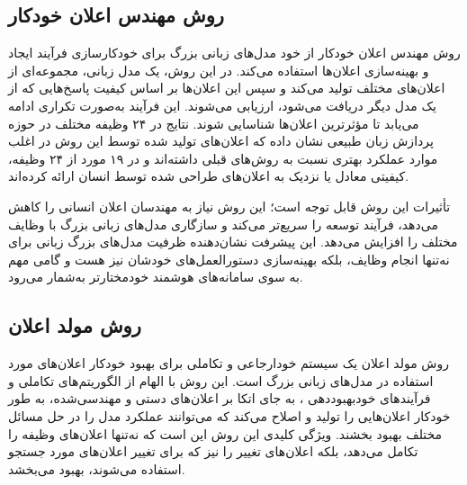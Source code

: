\subsection{روش مهندس اعلان خودکار}
روش  مهندس اعلان خودکار
 \cite{APE}
 از خود مدل‌های زبانی بزرگ برای خودکارسازی فرآیند ایجاد و بهینه‌سازی اعلان‌ها استفاده می‌کند. در این روش، یک مدل زبانی، مجموعه‌ای از اعلان‌های مختلف تولید می‌کند و سپس این اعلان‌ها بر اساس کیفیت پاسخ‌هایی که از یک مدل دیگر دریافت می‌شود، ارزیابی می‌شوند. این فرآیند به‌صورت تکراری ادامه می‌یابد تا مؤثرترین اعلان‌ها شناسایی شوند. نتایج در ۲۴ وظیفه مختلف در حوزه پردازش زبان طبیعی نشان داده که اعلان‌های تولید شده توسط این روش در اغلب موارد عملکرد بهتری نسبت به روش‌های قبلی داشته‌اند و در ۱۹ مورد از ۲۴ وظیفه، کیفیتی معادل یا نزدیک به اعلان‌های طراحی شده توسط انسان ارائه کرده‌اند.

تأثیرات این روش قابل توجه است؛ این روش نیاز به مهندسان اعلان انسانی را کاهش می‌دهد، فرآیند توسعه را سریع‌تر می‌کند و سازگاری مدل‌های زبانی بزرگ با وظایف مختلف را افزایش می‌دهد. این پیشرفت نشان‌دهنده ظرفیت مدل‌های بزرگ زبانی برای نه‌تنها انجام وظایف، بلکه بهینه‌سازی دستورالعمل‌های خودشان نیز هست و گامی مهم به سوی سامانه‌های هوشمند خودمختارتر به‌شمار می‌رود.

\subsection{روش مولد اعلان}
روش مولد اعلان
 \cite{PromptBreeder}
 یک سیستم خودارجاعی
  و تکاملی برای بهبود خودکار اعلان‌های مورد استفاده در مدل‌های زبانی بزرگ است. این روش با الهام از الگوریتم‌های تکاملی و فرآیندهای خودبهبوددهی
  ، به جای اتکا بر اعلان‌های دستی و مهندسی‌شده، به طور خودکار اعلان‌هایی را تولید و اصلاح می‌کند که می‌توانند عملکرد مدل را در حل مسائل مختلف بهبود بخشند. ویژگی کلیدی این روش این است که نه‌تنها اعلان‌های وظیفه
   را تکامل می‌دهد، بلکه اعلان‌های تغییر
    را نیز که برای تغییر اعلان‌های مورد جستجو استفاده می‌شوند، بهبود می‌بخشد.  

